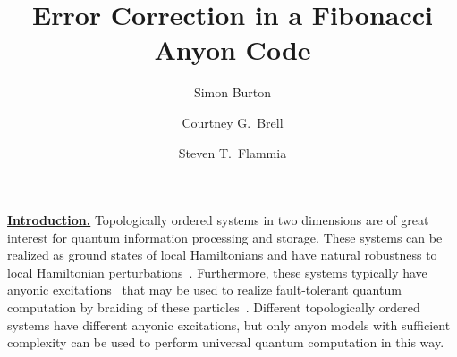 \documentclass[12pt,notitlepage,aps,pra,longbibliography,nofootinbib,tightenlines,superscriptaddress]{revtex4}
\def\heading #1{\vskip 20pt \noindent\underline{\large \bf #1}\vskip 5pt}
\def\important #1{\underline{\bf #1}}
\begin{document}
\title{Error Correction in a Fibonacci Anyon Code}



\author{Simon Burton}
\author{Courtney G.\ Brell}
\author{Steven T.\ Flammia}




\maketitle



\important{Introduction.}
Topologically ordered systems in two dimensions are of great interest  
for quantum information processing and storage. These systems can be  
realized as ground states of local Hamiltonians and have natural  
robustness to local Hamiltonian perturbations~\cite{Bravyi2010,  
Bravyi2011a, Michalakis2013}. Furthermore, these systems typically  
have anyonic excitations~\cite{Wilczek1990, Kitaev2006} that may be  
used to realize fault-tolerant quantum computation by braiding of  
these particles~\cite{Kitaev2003, Nayak2008}. Different topologically  
ordered systems have different anyonic excitations, but only anyon  
models with sufficient complexity can be used to perform universal  
quantum computation in this way.
\end{document}

